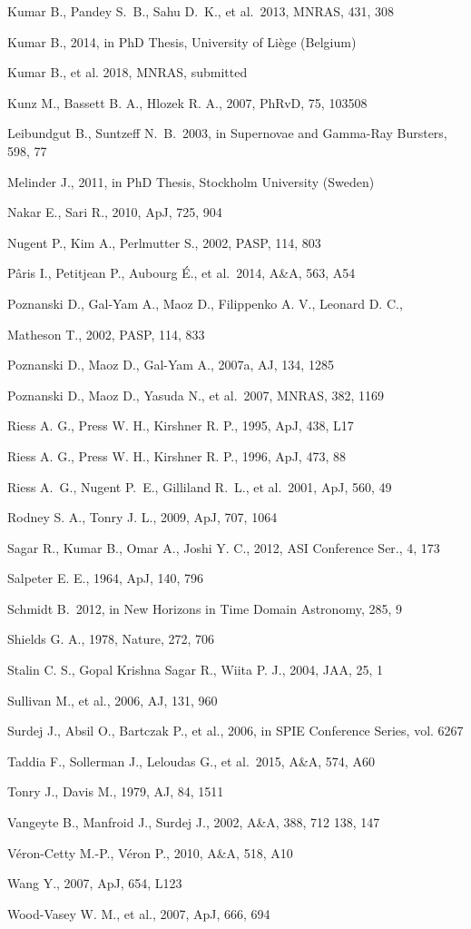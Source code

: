 \documentclass[12pt,a4paper]{article}
\begin{document}
 Kumar B., Pandey S.~B., Sahu D.~K., et al.\ 2013, MNRAS, 431, 308

 Kumar B., 2014, in PhD Thesis, University of Li\`{e}ge (Belgium)

 Kumar B., et al. 2018,  MNRAS, submitted

 Kunz M., Bassett B. A., Hlozek R. A., 2007, PhRvD, 75, 103508

 Leibundgut B., Suntzeff N.~B.\ 2003, in Supernovae and Gamma-Ray Bursters, 598, 77

 Melinder J., 2011, in PhD Thesis, Stockholm University (Sweden)

 Nakar E., Sari R., 2010, ApJ, 725, 904

 Nugent P., Kim A., Perlmutter S., 2002, PASP, 114, 803

 P{\^a}ris I., Petitjean P., Aubourg {\'E}., et al.\ 2014, A\&A, 563, A54

 Poznanski D., Gal-Yam A., Maoz D., Filippenko A. V., Leonard D. C.,

 Matheson T., 2002, PASP, 114, 833

 Poznanski D., Maoz D., Gal-Yam A., 2007a, AJ, 134, 1285

 Poznanski D., Maoz D., Yasuda N., et al.\ 2007, MNRAS, 382, 1169 

 Riess A. G., Press W. H., Kirshner R. P., 1995, ApJ, 438, L17

 Riess A. G., Press W. H., Kirshner R. P., 1996, ApJ, 473, 88

 Riess A.~G., Nugent P.~E., Gilliland R.~L., et al.\ 2001, ApJ, 560, 49 

 Rodney S. A., Tonry J. L., 2009, ApJ, 707, 1064

 Sagar R., Kumar B., Omar A., Joshi Y. C., 2012, ASI Conference Ser., 4, 173

 Salpeter E. E., 1964, ApJ, 140, 796

 Schmidt B.\ 2012, in New Horizons in Time Domain Astronomy, 285, 9 

 Shields G. A., 1978, Nature, 272, 706

 Stalin C. S., Gopal Krishna Sagar R., Wiita P. J., 2004, JAA, 25, 1

 Sullivan M., et al., 2006, AJ, 131, 960

 Surdej J., Absil O., Bartczak P., et al., 2006, in SPIE Conference Series, vol. 6267

 Taddia F., Sollerman J., Leloudas G., et al.\ 2015, A\&A, 574, A60 

 Tonry J., Davis M., 1979, AJ, 84, 1511

 Vangeyte B., Manfroid J., Surdej J., 2002, A\&A, 388, 712 138, 147

 V\'eron-Cetty M.-P., V\'eron P., 2010, A\&A, 518, A10

 Wang Y., 2007, ApJ, 654, L123

 Wood-Vasey W. M., et al., 2007, ApJ, 666, 694

\endrefer           
\end{document}
